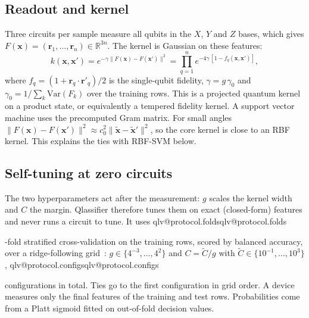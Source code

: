 \documentclass[aps,pra,reprint,superscriptaddress,nofootinbib,longbibliography]{revtex4-2}
\makeatletter
\newcommand{\val}[1]{\ifcsname qlv@#1\endcsname\csname qlv@#1\endcsname\else
  \PackageError{qlassifier}{No value '#1'}{Run python scripts/paper_tables.py}\fi}
\makeatother
\begin{document}
\subsection{Readout and kernel}
Three circuits per sample measure all qubits in the $X$, $Y$ and $Z$ bases, which gives $F(\mathbf{x}) =
(\mathbf{r}_1, \dots, \mathbf{r}_n) \in \mathbb{R}^{3n}$. The kernel is Gaussian on these features:
\begin{equation}
k(\mathbf{x}, \mathbf{x}') = e^{-\gamma \lVert F(\mathbf{x}) - F(\mathbf{x}') \rVert^2}
= \prod_{q=1}^{n} e^{-4\gamma\, [1 - f_q(\mathbf{x}, \mathbf{x}')]},
\label{eq:kernel}
\end{equation}
where $f_q = (1 + \mathbf{r}_q \cdot \mathbf{r}'_q)/2$ is the single-qubit fidelity, $\gamma = g\, \gamma_0$ and
$\gamma_0 = 1/\sum_k \mathrm{Var}(F_k)$ over the training rows. This is a projected quantum
kernel~\cite{huang2020power} on a product state, or equivalently a tempered fidelity kernel. A support vector machine
uses the precomputed Gram matrix. For small angles $\lVert F(\mathbf{x}) - F(\mathbf{x}') \rVert^2 \approx c_0^2
\lVert \tilde{\mathbf{x}} - \tilde{\mathbf{x}}' \rVert^2$, so the core kernel is close to an RBF kernel. This explains
the ties with RBF-SVM below.

\subsection{Self-tuning at zero circuits}
The two hyperparameters act after the measurement: $g$ scales the kernel width and $C$ the margin. Qlassifier therefore
tunes them on exact (closed-form) features and never runs a circuit to tune. It uses \val{protocol.folds}-fold stratified
cross-validation on the training rows, scored by balanced accuracy, over a ridge-following
grid~\cite{keerthi2003asymptotic}: $g \in \{4^{-3}, \dots, 4^{2}\}$ and $C = \tilde C / g$ with $\tilde C \in
\{10^{-1}, \dots, 10^{3}\}$, \val{protocol.configs} configurations in total. Ties go to the first configuration in grid
order. A device measures only the final features of the training and test rows. Probabilities come from a Platt
sigmoid fitted on out-of-fold decision values.
\end{document}
